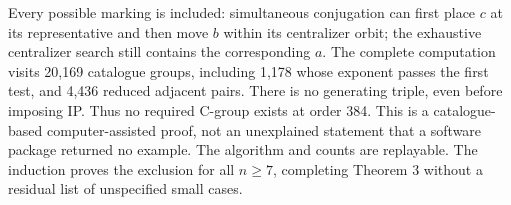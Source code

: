 Every possible marking is included: simultaneous conjugation can first
place \(c\) at its representative and then move \(b\) within its centralizer
orbit; the exhaustive centralizer search still contains the corresponding
\(a\). The complete computation visits 20,169 catalogue groups, including
1,178 whose exponent passes the first test, and 4,436 reduced adjacent
pairs. There is no generating triple, even before imposing IP. Thus
no required C-group exists at order 384. This is a catalogue-based
computer-assisted proof, not an unexplained statement that a software
package returned no example. The algorithm and counts are replayable.
The induction proves the exclusion for all \(n\geq7\), completing
Theorem 3 without a residual list of unspecified small cases.
